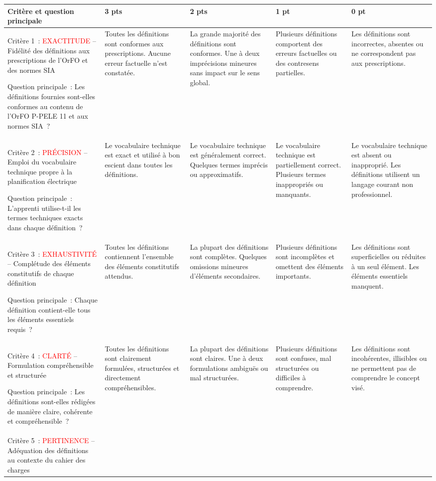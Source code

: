 \documentclass[a4paper,12pt,answers,addpoints]{exam}
\begin{document}
	\small
	\begin{longtable}{|p{}|p{}|p{}|p{}|p{}|}
		\hline
		\textbf{Critère et question principale} & \textbf{3 pts} & \textbf{2 pts} & \textbf{1 pt} & \textbf{0 pt} \\
		\hline
		Critère 1~: \textcolor{red}{EXACTITUDE} -- Fidélité des définitions aux prescriptions de l'OrFO et des normes SIA
		
		\smallskip
		Question principale~: Les définitions fournies sont-elles conformes au contenu de l'OrFO P-PELE 11 et aux normes SIA~?
		&
		Toutes les définitions sont conformes aux prescriptions. Aucune erreur factuelle n'est constatée.
		&
		La grande majorité des définitions sont conformes. Une à deux imprécisions mineures sans impact sur le sens global.
		&
		Plusieurs définitions comportent des erreurs factuelles ou des contresens partielles.
		&
		Les définitions sont incorrectes, absentes ou ne correspondent pas aux prescriptions. \\
		\hline
		Critère 2~: \textcolor{red}{PRÉCISION} -- Emploi du vocabulaire technique propre à la planification électrique
		
		\smallskip
		Question principale~: L'apprenti utilise-t-il les termes techniques exacts dans chaque définition~?
		&
		Le vocabulaire technique est exact et utilisé à bon escient dans toutes les définitions.
		&
		Le vocabulaire technique est généralement correct. Quelques termes imprécis ou approximatifs.
		&
		Le vocabulaire technique est partiellement correct. Plusieurs termes inappropriés ou manquants.
		&
		Le vocabulaire technique est absent ou inapproprié. Les définitions utilisent un langage courant non professionnel. \\
		\hline
		Critère 3~: \textcolor{red}{EXHAUSTIVITÉ} -- Complétude des éléments constitutifs de chaque définition
		
		\smallskip
		Question principale~: Chaque définition contient-elle tous les éléments essentiels requis~?
		&
		Toutes les définitions contiennent l'ensemble des éléments constitutifs attendus.
		&
		La plupart des définitions sont complètes. Quelques omissions mineures d'éléments secondaires.
		&
		Plusieurs définitions sont incomplètes et omettent des éléments importants.
		&
		Les définitions sont superficielles ou réduites à un seul élément. Les éléments essentiels manquent. \\
		\hline
		Critère 4~: \textcolor{red}{CLARTÉ} -- Formulation compréhensible et structurée
		
		\smallskip
		Question principale~: Les définitions sont-elles rédigées de manière claire, cohérente et compréhensible~?
		&
		Toutes les définitions sont clairement formulées, structurées et directement compréhensibles.
		&
		La plupart des définitions sont claires. Une à deux formulations ambiguës ou mal structurées.
		&
		Plusieurs définitions sont confuses, mal structurées ou difficiles à comprendre.
		&
		Les définitions sont incohérentes, illisibles ou ne permettent pas de comprendre le concept visé. \\
		\hline
		Critère 5~: \textcolor{red}{PERTINENCE} -- Adéquation des définitions au contexte du cahier des charges
		

\end{longtable}
\end{document}
